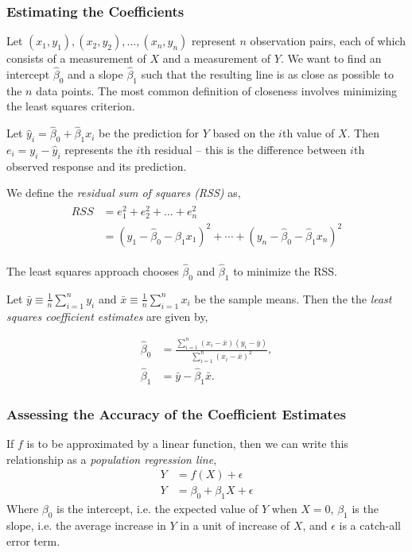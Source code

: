 \documentclass{article}
\numberwithin{equation}{section}
\begin{document}
\subsubsection{Estimating the Coefficients}
Let $(x_1, y_1), (x_2, y_2),..., (x_n, y_n)$ represent $n$ observation pairs, each of which consists of a measurement of $X$ and a measurement of $Y$. We want to find an intercept $\hat \beta_0 $ and a slope $\hat \beta_1$ such that the resulting line is as close as possible to the $n$ data points. The most common definition of closeness involves minimizing the least squares criterion.

Let $\hat y_i = \hat \beta_0 + \hat \beta_1 x_i$ be the prediction for $Y$ based on the $i$th value of $X$. Then $e_i = y_i - \hat y_i$ represents the $i$th residual -- this is the difference between $i$th observed response and its prediction. 

We define the \textit{residual sum of squares (RSS)} as,
\begin{align}\label{eq:RSS}
\begin{split}
     RSS &= e_1^2 + e_2^2 + \dots + e_n^2\\
     &=  (y_1 - \hat \beta_0 - \hat \beta_1 x_1)^2 + \cdots + 
     (y_n - \hat \beta_0 - \hat \beta_1 x_n)^2
\end{split}
\end{align}

The least squares approach chooses $\hat \beta_0 $ and $\hat \beta_1$ to minimize the RSS.

Let $ \bar y \equiv \frac{1}{n} \sum^n_{i=1} y_i$ and $\bar x \equiv \frac{1}{n} \sum_{i=1}^n x_i$ be the sample means. Then the the \textit{least squares coefficient estimates} are given by,

\begin{align*}
    \hat \beta_0 &= \frac{\sum_{i=1}^n (x_i - \bar x) (y_i - \bar y)}{\sum_{i=1}^n (x_i - \bar x)^2}, \\ 
    \hat \beta_1 &= \bar y - \hat \beta_1 \bar x.
\end{align*}

 
\subsubsection{Assessing the Accuracy of the Coefficient Estimates}

If $f$ is to be approximated by a linear function, then we can write this relationship as a \textit{population regression line},
\begin{align*}
 Y &= f(X) +  \epsilon \\
 Y  &= \beta_0 +  \beta_1 X + \epsilon
\end{align*}
Where $\beta_0$ is the intercept, i.e. the expected value of $Y$ when $X = 0$, $\beta_1$ is the slope, i.e.  the average increase in $Y$ in a unit of increase of $X$, and $\epsilon$ is a catch-all error term.
 
\end{document}
